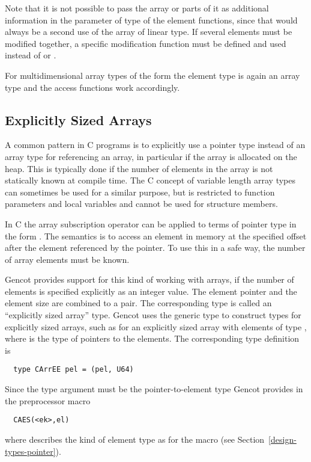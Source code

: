 Note that it is not possible
to pass the array or parts of it as additional information in the parameter of type  of the element
functions, since that would always be
a second use of the array of linear type. If several elements must be modified together, a specific modification function
must be defined and used instead of  or .

For multidimensional array types of the form  the element type is again an array type and the access 
functions work accordingly.

\subsection{Explicitly Sized Arrays}
\label{design-operations-eearray}

A common pattern in C programs is to explicitly use a pointer type instead of an array type for referencing an array,
in particular if the array is allocated on the heap. This is typically done if the number of elements in the
array is not statically known at compile time. The C concept of variable length array types can sometimes be
used for a similar purpose, but is restricted to function parameters and local variables and cannot be used for
structure members.

In C the array subscription operator can be applied to terms of pointer type  in the form . 
The semantics is to access an element in memory at the specified offset after the element referenced by the pointer. 
To use this in a safe way, the number of array elements must be known. 

Gencot provides support for this kind of working with arrays, if the number of elements is specified explicitly as
an integer value. The element pointer and the element size are combined to a pair. The corresponding type is called
an ``explicitly sized array'' type. Gencot uses the generic type 
to construct types for explicitly sized arrays, such as  for an explicitly sized array with elements
of type , where  is the type of pointers to the elements. The corresponding type definition is
\begin{verbatim}
  type CArrEE pel = (pel, U64)
\end{verbatim}

Since the type argument must be the pointer-to-element type Gencot provides in 
the preprocessor macro
\begin{verbatim}
  CAES(<ek>,el)
\end{verbatim}
where  describes the kind of element type as for the macro  (see Section~\ref{design-types-pointer}).

